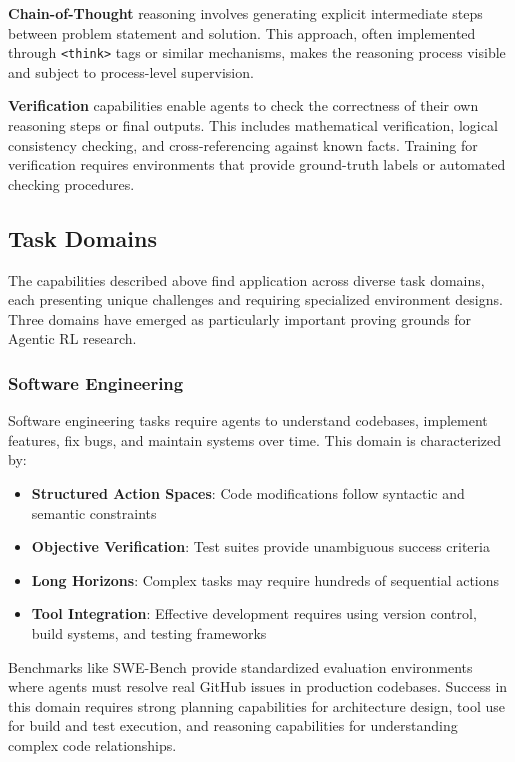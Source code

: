 \textbf{Chain-of-Thought} reasoning involves generating explicit intermediate steps between problem statement and solution. This approach, often implemented through \texttt{<think>} tags or similar mechanisms, makes the reasoning process visible and subject to process-level supervision.

\textbf{Verification} capabilities enable agents to check the correctness of their own reasoning steps or final outputs. This includes mathematical verification, logical consistency checking, and cross-referencing against known facts. Training for verification requires environments that provide ground-truth labels or automated checking procedures.

\subsection{Task Domains}

The capabilities described above find application across diverse task domains, each presenting unique challenges and requiring specialized environment designs. Three domains have emerged as particularly important proving grounds for Agentic RL research.

\subsubsection{Software Engineering}

Software engineering tasks require agents to understand codebases, implement features, fix bugs, and maintain systems over time. This domain is characterized by:

\begin{itemize}
    \item \textbf{Structured Action Spaces}: Code modifications follow syntactic and semantic constraints
    \item \textbf{Objective Verification}: Test suites provide unambiguous success criteria
    \item \textbf{Long Horizons}: Complex tasks may require hundreds of sequential actions
    \item \textbf{Tool Integration}: Effective development requires using version control, build systems, and testing frameworks

\end{itemize}
Benchmarks like SWE-Bench provide standardized evaluation environments where agents must resolve real GitHub issues in production codebases. Success in this domain requires strong planning capabilities for architecture design, tool use for build and test execution, and reasoning capabilities for understanding complex code relationships.


